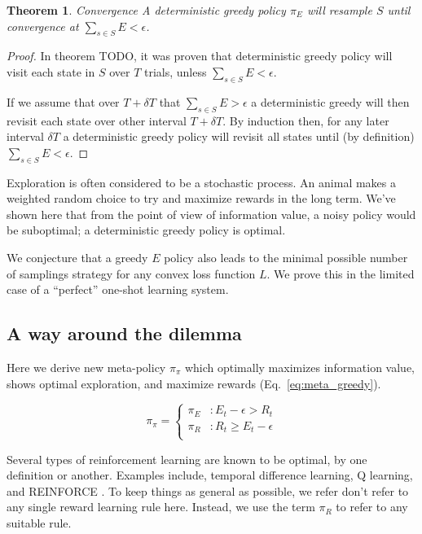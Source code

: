 \documentclass[9pt,twocolumn,twoside]{pnas-new}
\newtheorem{theorem}{Theorem}
\begin{document}
\begin{theorem}{Convergence}
    A deterministic greedy policy $\pi_E$ will resample $S$ until convergence at $\sum_{s \in S} E < \epsilon$.
\end{theorem}
\begin{proof}
    In theorem TODO, it was proven that deterministic greedy policy will visit each state in $S$ over $T$ trials, unless $\sum_{s \in S} E < \epsilon$. 
    
    If we assume that over $T + \delta T$ that $\sum_{s \in S} E > \epsilon$ a deterministic greedy will then revisit each state over other interval $T + \delta T$. By induction then, for any later interval $\delta T$ a deterministic greedy policy will revisit all states until (by definition) $\sum_{s \in S} E < \epsilon$.
\end{proof}


Exploration is often considered to be a stochastic process. An animal makes a weighted random choice to try and maximize rewards in the long term. We've shown here that from the point of view of information value, a noisy policy would be suboptimal; a deterministic greedy policy is optimal.

We conjecture that a greedy $E$ policy also leads to the minimal possible number of samplings strategy for any convex loss function $L$. We prove this in the limited case of a ``perfect'' one-shot learning system.


\subsection*{A way around the dilemma}
Here we derive new meta-policy $\pi_{\pi}$ which optimally maximizes information value, shows optimal exploration, and maximize rewards (Eq.~\ref{eq:meta_greedy}).

\begin{equation}
    \pi_{\pi} = 
    \begin{cases}
        \pi_E & : E_t - \epsilon > R_t \\
        \pi_R & : R_t \geq E_t - \epsilon \\
    \end{cases}
    \label{eq:meta_greedy}
\end{equation}

Several types of reinforcement learning are known to be optimal, by one definition or another. Examples include, temporal difference learning, Q learning, and REINFORCE \cite{Sutton2018}. To keep things as general as possible, we refer don't refer to any single reward learning rule here. Instead, we use the term $\pi_R$ to refer to any suitable rule.
\end{document}
